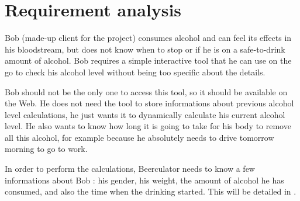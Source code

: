 \section{Requirement analysis}
\label{sec:req}

Bob (made-up client for the project) consumes alcohol and can feel its effects in his bloodstream, but does not know when to stop or if he is on a safe-to-drink amount of alcohol. Bob requires a simple interactive tool that he can use on the go to check his alcohol level without being too specific about the details.
  
Bob should not be the only one to access this tool, so it should be available on the Web. He does not need the tool to store informations about previous alcohol level calculations, he just wants it to dynamically calculate his current alcohol level. He also wants to know how long it is going to take for his body to remove all this alcohol, for example because he absolutely needs to drive tomorrow morning to go to work.

In order to perform the calculations, Beerculator needs to know a few informations about Bob : his gender, his weight, the amount of alcohol he has consumed, and also the time when the drinking started. This will be detailed in \label{sec:spec}.
